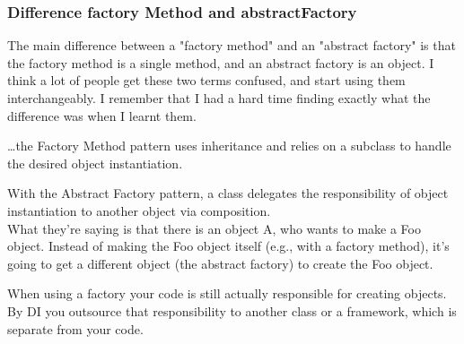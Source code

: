 \subsubsection{Difference factory Method and abstractFactory}
\begin{sectionbox}\nospacing
  The main difference between a "factory method" and an "abstract factory" is that the factory method is a single method, and an abstract factory is an object. I think a lot of people get these two terms confused, and start using them interchangeably. I remember that I had a hard time finding exactly what the difference was when I learnt them.
\end{sectionbox}
\begin{sectionbox}\nospacing
  \ldots the Factory Method pattern uses inheritance and relies on a subclass to
  handle the desired object instantiation.
\end{sectionbox}
\begin{sectionbox}\nospacing
  With the Abstract Factory pattern, a class delegates the responsibility of
  object instantiation to another object via composition.\\
  What they're saying is that there is an object A, who wants to make a Foo object. Instead of making the Foo object itself (e.g., with a factory method), it's going to get a different object (the abstract factory) to create the Foo object.
\end{sectionbox}
\begin{notebox}[Factory vs. DI]\nospacing
  When using a factory your code is still actually responsible for creating objects. By DI you outsource that responsibility to another class or a framework, which is separate from your code.
\end{notebox}
